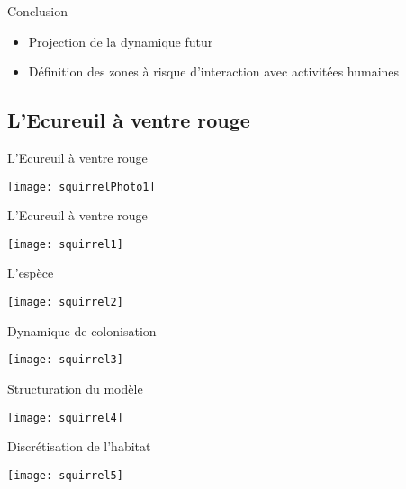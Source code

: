 \documentclass[]{beamer}
\begin{document}
\begin{frame}{Conclusion}
  \begin{itemize}
  \item Projection de la dynamique futur  
  \item Définition des zones à risque d'interaction avec activitées humaines

  \end{itemize}

\end{frame}




\subsection{L'Ecureuil à ventre rouge}
\begin{frame}{L'Ecureuil à ventre rouge}
  \begin{center}
    \texttt{[image: squirrelPhoto1]}
  \end{center}
\end{frame}

\begin{frame}{L'Ecureuil à ventre rouge}
  \begin{center}
    \texttt{[image: squirrel1]}
  \end{center}
\end{frame}


\begin{frame}{L'espèce}
  \begin{center}
    \texttt{[image: squirrel2]}
  \end{center}
\end{frame}



\begin{frame}{Dynamique de colonisation}
  \begin{center}
    \texttt{[image: squirrel3]}
  \end{center}
\end{frame}


\begin{frame}{Structuration du modèle}
  \begin{center}
    \texttt{[image: squirrel4]}
  \end{center}
\end{frame}


\begin{frame}{Discrétisation de l'habitat}
  \begin{center}
    \texttt{[image: squirrel5]}
  \end{center}
\end{frame}
\end{document}

